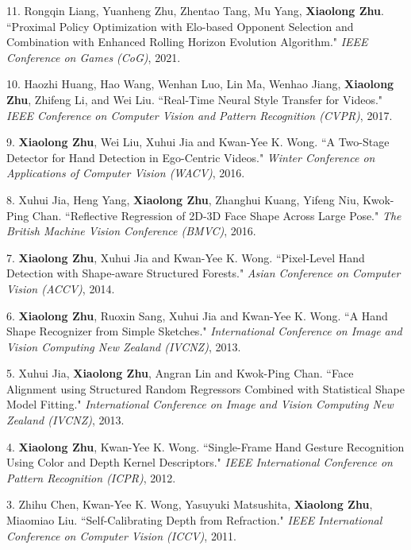 \documentclass[10pt]{article}
\makeatletter
\newlength{\bibhang}
\newlength{\bibsep}
 {\@listi \global\bibsep\itemsep \global\advance\bibsep by\parsep}
\newenvironment{bibsection}%
        {\vspace{\itemsep}\begin{list}{}{%
       \setlength{\leftmargin}{\bibhang}%
       \setlength{\itemsep}{\bibsep}%
       \setlength{\parsep}{\z@}%
        \setlength{\partopsep}{0pt}%
        \setlength{\topsep}{0pt}}}
        {\end{list}\vspace{\itemsep}}
\makeatother
\begin{document}
\begin{bibsection}
    \item[11.]Rongqin Liang, Yuanheng Zhu, Zhentao Tang, Mu Yang, \textbf{Xiaolong Zhu}. ``Proximal Policy Optimization with Elo-based Opponent Selection and Combination with Enhanced Rolling Horizon Evolution Algorithm." \emph{IEEE Conference on Games (CoG)}, 2021.

    \item[10.] Haozhi Huang, Hao Wang, Wenhan Luo, Lin Ma, Wenhao Jiang, \textbf{Xiaolong Zhu}, Zhifeng Li, and Wei Liu. ``Real-Time Neural Style Transfer for Videos." \emph{IEEE Conference on Computer Vision and Pattern Recognition (CVPR)}, 2017.

  \item[9.] \textbf{Xiaolong Zhu}, Wei Liu, Xuhui Jia and Kwan-Yee K. Wong. ``A Two-Stage Detector for Hand Detection in Ego-Centric Videos." \emph{Winter Conference on Applications of Computer Vision (WACV)}, 2016.
  
  \item[8.] Xuhui Jia, Heng Yang, \textbf{Xiaolong Zhu}, Zhanghui Kuang, Yifeng Niu, Kwok-Ping Chan. ``Reflective Regression of 2D-3D Face Shape Across Large Pose." \emph{The British Machine Vision Conference (BMVC)}, 2016.

  \item[7.] \textbf{Xiaolong Zhu}, Xuhui Jia and Kwan-Yee K. Wong. ``Pixel-Level Hand Detection with Shape-aware Structured Forests." \emph{Asian Conference on Computer Vision (ACCV)}, 2014.

  \item[6.] \textbf{Xiaolong Zhu}, Ruoxin Sang, Xuhui Jia and Kwan-Yee K. Wong. ``A Hand Shape Recognizer from Simple Sketches." \emph{International Conference on Image and Vision Computing New Zealand (IVCNZ)}, 2013.

  \item[5.] Xuhui Jia, \textbf{Xiaolong Zhu}, Angran Lin and Kwok-Ping Chan. ``Face Alignment using Structured Random Regressors Combined with Statistical Shape Model Fitting." \emph{International Conference on Image and Vision Computing New Zealand (IVCNZ)}, 2013.

  \item[4.] \textbf{Xiaolong Zhu}, Kwan-Yee K. Wong. ``Single-Frame Hand Gesture Recognition Using Color and Depth Kernel Descriptors." \emph{IEEE International Conference on Pattern Recognition (ICPR)}, 2012.

  \item[3.] Zhihu Chen, Kwan-Yee K. Wong, Yasuyuki Matsushita, \textbf{Xiaolong Zhu}, Miaomiao Liu. ``Self-Calibrating Depth from Refraction." \emph{IEEE International Conference on Computer Vision (ICCV)}, 2011.


\end{bibsection}
\end{document}
